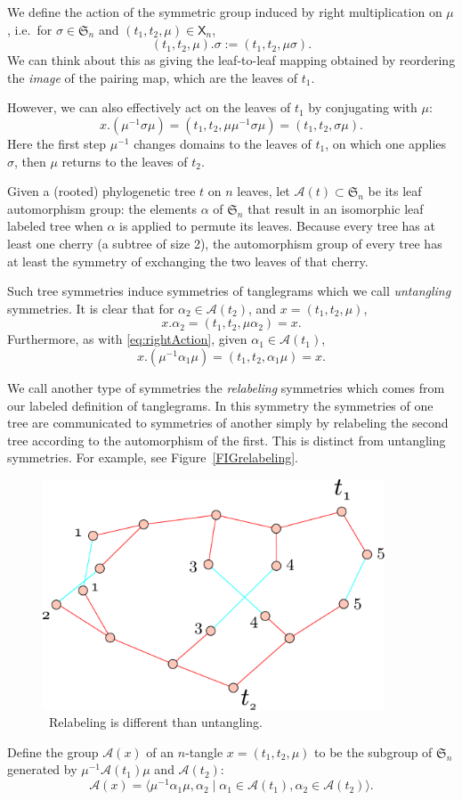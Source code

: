 \documentclass{amsart}
\newcommand{\fS}{\mathfrak S}
\newcommand{\aut}{\mathcal A}
\newcommand{\pairing}{\mu}
\newcommand{\tangle}{\mathsf{X}}
\newcommand{\arxiv}[1]{#1}
\newcommand{\FIGrelabeling}{\
\label{FIGrelabeling}
\begin{figure}
  \arxiv{\includegraphics[width=4in]{figures/relabeling-example}}
\caption{\
  Relabeling is different than untangling.
}
\end{figure}
}
\begin{document}
We define the action of the symmetric group induced by right multiplication on $\pairing$, i.e.\ for $\sigma \in \fS_n$ and $(t_1, t_2, \pairing) \in \tangle_n$,
\[
(t_1, t_2, \pairing) . \sigma := (t_1, t_2, \pairing \sigma).
\]
We can think about this as giving the leaf-to-leaf mapping obtained by reordering the \emph{image} of the pairing map, which are the leaves of $t_1$.

However, we can also effectively act on the leaves of $t_1$ by conjugating with $\pairing$:
\begin{equation}
\label{eq:rightAction}
x . (\pairing^{-1} \sigma \pairing)
= (t_1, t_2, \pairing \pairing^{-1} \sigma \pairing)
= (t_1, t_2, \sigma \pairing).
\end{equation}
Here the first step $\pairing^{-1}$ changes domains to the leaves of $t_1$, on which one applies $\sigma$, then $\pairing$ returns to the leaves of $t_2$.

Given a (rooted) phylogenetic tree $t$ on $n$ leaves, let $\aut(t) \subset \fS_n$ be its leaf automorphism group: the elements $\alpha$ of $\fS_n$ that result in an isomorphic leaf labeled tree when $\alpha$ is applied to permute its leaves.
Because every tree has at least one cherry (a subtree of size 2), the automorphism group of every tree has at least the symmetry of exchanging the two leaves of that cherry.

Such tree symmetries induce symmetries of tanglegrams which we call \emph{untangling} symmetries.
It is clear that for $\alpha_2 \in \aut(t_2)$, and $x = (t_1, t_2, \pairing)$,
\[
x . \alpha_2 = (t_1, t_2, \pairing \alpha_2) = x.
\]
Furthermore, as with \eqref{eq:rightAction}, given $\alpha_1 \in \aut(t_1)$,
\[
x . (\pairing^{-1} \alpha_1 \pairing) = (t_1, t_2, \alpha_1 \pairing) = x.
\]

We call another type of symmetries the \emph{relabeling} symmetries which comes from our labeled definition of tanglegrams.
In this symmetry the symmetries of one tree are communicated to symmetries of another simply by relabeling the second tree according to the automorphism of the first.
This is distinct from untangling symmetries.
For example, see Figure~\ref{FIGrelabeling}.
\FIGrelabeling

Define the group $\aut(x)$ of an $n$-tangle $x = (t_1, t_2, \pairing)$ to be the subgroup of $\fS_n$ generated by $\pairing^{-1} \aut(t_1) \pairing$ and $\aut(t_2)$:
\[
\aut(x) = \langle \pairing^{-1} \alpha_1 \pairing, \alpha_2 \mid \alpha_1 \in \aut(t_1), \alpha_2 \in \aut(t_2) \rangle.
\]
\end{document}
